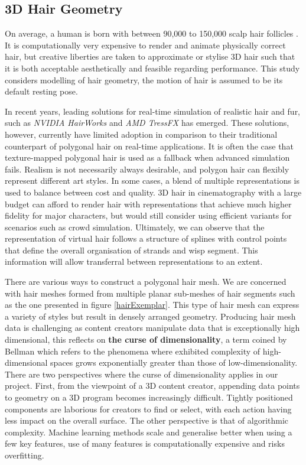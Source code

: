 \documentclass[ %
author={Dillon Keith Diep},
supervisor={Dr. Carl Henrik Ek},
degree={MEng},
title={ART-CG Hair:},
subtitle={Assisted Real-time Content Generation of Stylised Virtual Hair},
type={Research},
year={2017} ]{dissertation}
\begin{document}
\subsection{3D Hair Geometry}
On average, a human is born with between 90,000 to 150,000 scalp hair follicles \cite{hairfollicles}. It is computationally very expensive to render and animate physically correct hair, but creative liberties are taken to approximate or stylise 3D hair such that it is both acceptable aesthetically and feasible regarding performance. This study considers modelling of hair geometry, the motion of hair is assumed to be its default resting pose.

In recent years, leading solutions for real-time simulation of realistic hair and fur, such as \textit{NVIDIA HairWorks} and \textit{AMD TressFX} has emerged. These solutions, however, currently have limited adoption in comparison to their traditional counterpart of polygonal hair on real-time applications. It is often the case that texture-mapped polygonal hair is used as a fallback when advanced simulation fails. Realism is not necessarily always desirable, and polygon hair can flexibly represent different art styles. In some cases, a blend of multiple representations is used to balance between cost and quality. 3D hair in cinematography with a large budget can afford to render hair with representations that achieve much higher fidelity for major characters, but would still consider using efficient variants for scenarios such as crowd simulation. Ultimately, we can observe that the representation of virtual hair follows a structure of splines with control points that define the overall organisation of strands and wisp segment. This information will allow transferral between representations to an extent.

There are various ways to construct a polygonal hair mesh. We are concerned with hair meshes formed from multiple planar sub-meshes of hair segments such as the one presented in figure \ref{hairExemplar}. This type of hair mesh can express a variety of styles but result in densely arranged geometry. 
Producing hair mesh data is challenging as content creators manipulate data that is exceptionally high dimensional, this reflects on \textbf{the curse of dimensionality}, a term coined by Bellman \cite{curseofdim} which refers to the phenomena where exhibited complexity of high-dimensional spaces grows exponentially greater than those of low-dimensionality. There are two perspectives where the curse of dimensionality applies in our project. First, from the viewpoint of a 3D content creator, appending data points to geometry on a 3D program becomes increasingly difficult. Tightly positioned components are laborious for creators to find or select, with each action having less impact on the overall surface. The other perspective is that of algorithmic complexity. Machine learning methods scale and generalise better when using a few key features, use of many features is computationally expensive and risks overfitting.
\end{document}
